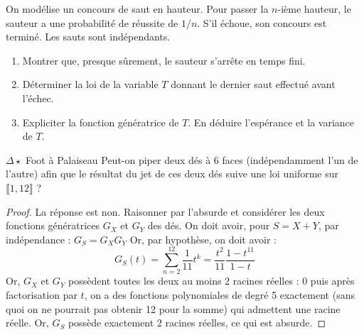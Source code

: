 \documentclass[french,a4paper]{article}
\theoremstyle{plain}
\theoremstyle{definition}
\theoremstyle{remark}
\begin{document}
\begin{ex}{}
	On modélise un concours de saut en hauteur. Pour passer la $n$-ième hauteur, le sauteur a une probabilité de réussite de $1/n$. S'il échoue, son concours est terminé. Les sauts sont indépendants.
	\begin{enumerate}
		\item Montrer que, presque sûrement, le sauteur s'arrête en temps fini.
		\item Déterminer la loi de la variable $T$ donnant le dernier saut effectué avant l'échec.
		\item Expliciter la fonction génératrice de $T$. En déduire l'espérance et la variance de $T$.
	\end{enumerate}
\end{ex}

\begin{ex}{$\Delta\star$ Foot à Palaiseau}
	Peut-on piper deux dés à $6$ faces (indépendamment l'un de l'autre) afin que le résultat du jet de ces deux dés suive une loi uniforme sur $\llbracket1,12\rrbracket$ ?
\end{ex}
\begin{proof}
	La réponse est non. Raisonner par l'absurde et considérer les deux fonctions génératrices $G_X$ et $G_Y$ des dés. On doit avoir, pour $S=X+Y$, par indépendance : $G_S=G_XG_Y$ Or, par hypothèse, on doit avoir : $$G_S(t)=\sum_{n=2}^{12}\frac{1}{11}t^k=\frac{t^2}{11}\frac{1-t^{11}}{1-t}$$ Or, $G_X$ et $G_Y$ possèdent toutes les deux au moins 2 racines réelles : $0$ puis après factorisation par $t$, on a des fonctions polynomiales de degré 5 exactement (sans quoi on ne pourrait pas obtenir 12 pour la somme) qui admettent une racine réelle. Or, $G_S$ possède exactement 2 racines réelles, ce qui est absurde.
\end{proof}
\end{document}
